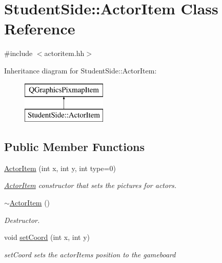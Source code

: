 \hypertarget{class_student_side_1_1_actor_item}{\section{Student\-Side\-:\-:Actor\-Item Class Reference}
\label{class_student_side_1_1_actor_item}
}


{\ttfamily \#include $<$actoritem.\-hh$>$}

Inheritance diagram for Student\-Side\-:\-:Actor\-Item\-:\begin{figure}[H]
\begin{center}
\leavevmode
\includegraphics[height=2.000000cm]{class_student_side_1_1_actor_item}
\end{center}
\end{figure}
\subsection*{Public Member Functions}
\begin{DoxyCompactItemize}
\item 
\hyperlink{class_student_side_1_1_actor_item_a741d8a8d3413683146380fa1311e7ffa}{Actor\-Item} (int x, int y, int type=0)
\begin{DoxyCompactList}\small\item\em \hyperlink{class_student_side_1_1_actor_item}{Actor\-Item} constructor that sets the pictures for actors. \end{DoxyCompactList}\item 
\hyperlink{class_student_side_1_1_actor_item_a089e14fc439cd834bd8aec50cd55be87}{$\sim$\-Actor\-Item} ()
\begin{DoxyCompactList}\small\item\em Destructor. \end{DoxyCompactList}\item 
void \hyperlink{class_student_side_1_1_actor_item_a5a2f0d7ad57b6a71f24112682e46c9a3}{set\-Coord} (int x, int y)
\begin{DoxyCompactList}\small\item\em set\-Coord sets the actor\-Items position to the gameboard \end{DoxyCompactList}\end{DoxyCompactItemize}


